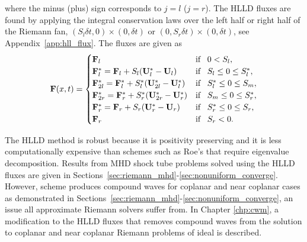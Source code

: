 where the minus (plus) sign corresponds to $j=l$ ($j=r$).  The HLLD fluxes are found by applying the integral conservation laws over the left half or right half of the Riemann fan, $(S_l\delta t, 0)\times (0,\delta t)$ or $(0,S_r\delta t)\times (0,\delta t)$, see Appendix~\ref{app:hll_flux}.  The fluxes are given as
\begin{gather}
\label{eqn:hlld_flux}
\mbf{F}(x,t) = 
\begin{cases}
\mbf{F}_l   \phantom{= \mbf{F}_l  + S_l (\mbf{U_l^*} - \mbf{U_l}} & \text{if}\;\;\; 0 < S_l, \\
\mbf{F}_l^* = \mbf{F}_l  + S_l (\mbf{U}_l^* - \mbf{U}_l) & \text{if}\;\;\; S_l \le 0 \le S^*_l, \\
\mbf{F}_{2l}^* = \mbf{F}^*_l  + S^*_l (\mbf{U}_{2l}^* - \mbf{U}^*_l) & \text{if}\;\;\; S^*_l \le 0 \le S_m, \\
\mbf{F}_{2r}^* = \mbf{F}^*_r  + S^*_r (\mbf{U}_{2r}^* - \mbf{U}^*_r)  & \text{if}\;\;\; S_m \le 0 \le S^*_r, \\
\mbf{F}_r^* = \mbf{F}_r  + S_r (\mbf{U}_r^* - \mbf{U}_r)  & \text{if}\;\;\; S^*_r \le 0 \le S_r, \\
\mbf{F}_r  \phantom{= \mbf{F}_r  + S_r (\mbf{U_r^*} - \mbf{U_r}} & \text{if}\;\;\; S_r < 0. \\
\end{cases}
\end{gather}

The HLLD method is robust because it is positivity preserving and it is less computationally expensive than schemes such as Roe's that require eigenvalue decomposition.  Results from MHD shock tube problems solved using the HLLD fluxes are given in Sections~\ref{sec:riemann_mhd}-\ref{sec:nonuniform_converge}.  However, scheme produces compound waves for coplanar and near coplanar cases as demonstrated in Sections~\ref{sec:riemann_mhd}-\ref{sec:nonuniform_converge}, an issue all approximate Riemann solvers suffer from.  In Chapter \ref{chp:cwm}, a modification to the HLLD fluxes that removes compound waves from the solution to coplanar and near coplanar Riemann problems of ideal is described.  
